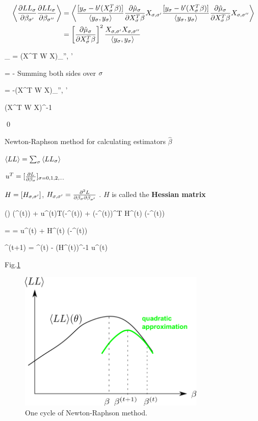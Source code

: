 \begin{align}
\left\langle\frac{\partial LL_\sigma}{\partial\beta_ { \sigma'}}
\frac{\partial LL_\sigma}{\partial\beta_ { \sigma''}} \right\rangle
&=
\left\langle
\frac{[y_\sigma - b'(X_\sigma^T\beta)]}{\left\langle y_\sigma, y_\sigma\right\rangle}
 \frac{\partial\hat{\mu}_\sigma}{\partial X_\sigma^T\beta}
X_{\sigma, \sigma'}
\frac{[y_\sigma - b'(X_\sigma^T\beta)]}{\left\langle y_\sigma, y_\sigma\right\rangle}
 \frac{\partial\hat{\mu}_\sigma}{\partial X_\sigma^T\beta}
X_{\sigma, \sigma''}
\right\rangle
\\
&=
 \left[\frac{\partial\hat{\mu}_\sigma}{\partial X_\sigma^T\beta}\right]^2
\frac{X_{\sigma, \sigma'} X_{\sigma, \sigma''}}{\left\langle y_\sigma, y_\sigma\right\rangle}
\end{align}

\beq
\sum_{\s}
=
(X^T W X)_{\s'', \s'}
\eeq

\beq
{}
=
-
\eeq
Summing both sides over $\sigma$

\beq
{}
=
-(X^T W X)_{\s'', \s'}
\eeq

\beq
{}\rarrow (X^T W X)^{-1}
\eeq

\qed

Newton-Raphson method for calculating
estimators $\hat{\beta}$

$\left\langle LL\right\rangle =\sum_\sigma \left\langle LL_\sigma\right\rangle$

$u^T = [\frac{\partial L}{\partial\beta_\sigma}]_{\sigma=0,1,2, \ldots}$

 $H= [H_{\sigma, \sigma'}]$, $H_{\sigma, \sigma'} =
\frac{\partial^2 L }{\partial\beta_\sigma\partial\beta_{\sigma'}}$ .
$H$ is called the {\bf Hessian matrix}


\beq
{}(\beta)
\approx
{}(\beta^{(t)})
+ u^{(t)T}(\beta-\beta^{(t)})
+ 
(\beta-\beta^{(t)})^T H^{(t)} (\beta-\beta^{(t)})
\eeq

 =
=
u^{(t)}
+
H^{(t)} (\beta-\beta^{(t)})
\eeq


\beq
\beta^{(t+1)} =
\beta^{(t)} -  (H^{(t)})^{-1} u^{(t)}
\eeq

Fig.\ref{fig-gml-new-rap}


\begin{figure}[h!]
\centering
\includegraphics[width=3.5in]
{gen-lin-mod/gen-lin-mod.png}
\caption{One cycle of Newton-Raphson method.}
\label{fig-gml-new-rap}
\end{figure}
